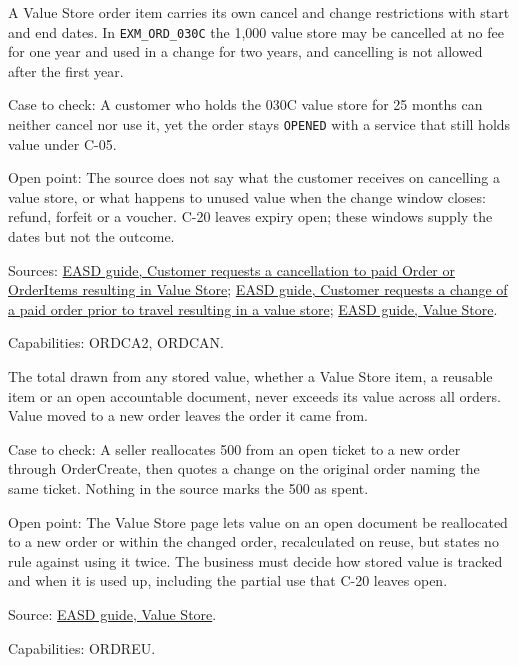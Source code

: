 \begin{definition}
  \label{def:change-cancellation-value-store-windows}
  \notready
  A Value Store order item carries its own cancel and change restrictions
  with start and end dates. In \texttt{EXM\_ORD\_030C} the 1,000 value store
  may be cancelled at no fee for one year and used in a change for two
  years, and cancelling is not allowed after the first year.

  Case to check: A customer who holds the 030C value store for 25 months can
  neither cancel nor use it, yet the order stays \texttt{OPENED} with a
  service that still holds value under C-05.

  Open point: The source does not say what the customer receives on
  cancelling a value store, or what happens to unused value when the change
  window closes: refund, forfeit or a voucher. C-20 leaves expiry open;
  these windows supply the dates but not the outcome.

  Sources: \href{https://standards.atlassian.net/wiki/spaces/EASD/pages/817594669}{EASD guide, Customer requests a cancellation to paid Order or OrderItems resulting in Value Store};
  \href{https://standards.atlassian.net/wiki/spaces/EASD/pages/842268791}{EASD guide, Customer requests a change of a paid order prior to travel resulting in a value store};
  \href{https://standards.atlassian.net/wiki/spaces/EASD/pages/574554245}{EASD guide, Value Store}.

  Capabilities: ORDCA2, ORDCAN.
\end{definition}

\begin{theorem}
  \label{thm:change-cancellation-stored-value-used-once}
  \notready
  The total drawn from any stored value, whether a Value Store item, a
  reusable item or an open accountable document, never exceeds its value
  across all orders. Value moved to a new order leaves the order it came
  from.

  Case to check: A seller reallocates 500 from an open ticket to a new order
  through OrderCreate, then quotes a change on the original order naming the
  same ticket. Nothing in the source marks the 500 as spent.

  Open point: The Value Store page lets value on an open document be
  reallocated to a new order or within the changed order, recalculated on
  reuse, but states no rule against using it twice. The business must decide
  how stored value is tracked and when it is used up, including the partial
  use that C-20 leaves open.

  Source: \href{https://standards.atlassian.net/wiki/spaces/EASD/pages/574554245}{EASD guide, Value Store}.

  Capabilities: ORDREU.
\end{theorem}

